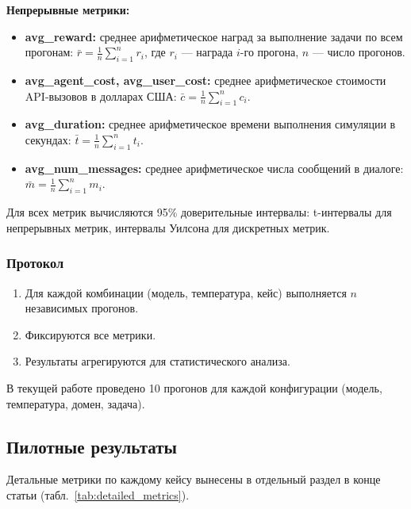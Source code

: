 \documentclass{article}
\begin{document}
\textbf{Непрерывные метрики:}
\begin{itemize}
    \item \textbf{avg\_reward:} среднее арифметическое наград за выполнение задачи по всем прогонам: $\bar{r} = \frac{1}{n}\sum_{i=1}^{n} r_i$, где $r_i$ --- награда $i$-го прогона, $n$ --- число прогонов.
    \item \textbf{avg\_agent\_cost, avg\_user\_cost:} среднее арифметическое стоимости API-вызовов в долларах США: $\bar{c} = \frac{1}{n}\sum_{i=1}^{n} c_i$.
    \item \textbf{avg\_duration:} среднее арифметическое времени выполнения симуляции в секундах: $\bar{t} = \frac{1}{n}\sum_{i=1}^{n} t_i$.
    \item \textbf{avg\_num\_messages:} среднее арифметическое числа сообщений в диалоге: $\bar{m} = \frac{1}{n}\sum_{i=1}^{n} m_i$.
\end{itemize}

Для всех метрик вычисляются 95\% доверительные интервалы: t-интервалы для непрерывных метрик, интервалы Уилсона для дискретных метрик.


\subsubsection{Протокол}

\begin{enumerate}
    \item Для каждой комбинации (модель, температура, кейс) выполняется $n$ независимых прогонов.
    \item Фиксируются все метрики.
    \item Результаты агрегируются для статистического анализа.
\end{enumerate}


В текущей работе проведено 10 прогонов для каждой конфигурации (модель, температура, домен, задача).

\subsection{Пилотные результаты}

Детальные метрики по каждому кейсу вынесены в отдельный раздел в конце статьи (табл.~\ref{tab:detailed_metrics}).

\end{document}

